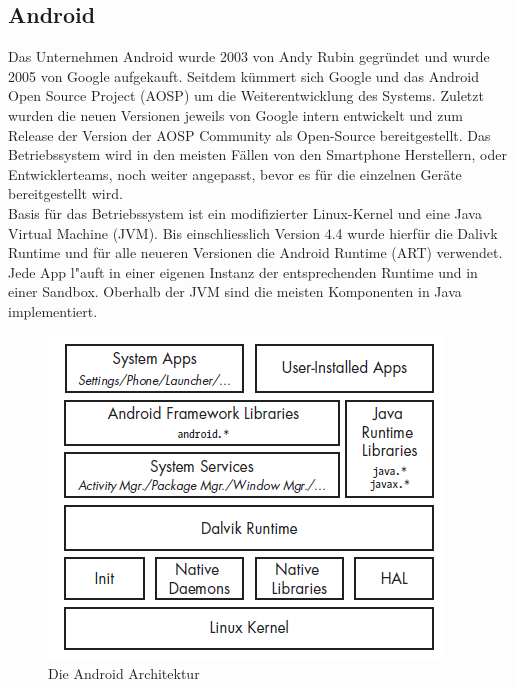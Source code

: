 \subsection{Android}
	Das Unternehmen Android wurde 2003 von Andy Rubin gegründet und wurde 2005 von Google aufgekauft. Seitdem kümmert sich Google und das Android Open Source Project (AOSP) um die Weiterentwicklung des Systems. Zuletzt wurden die neuen Versionen jeweils von Google intern entwickelt und zum Release der Version der AOSP Community als Open-Source bereitgestellt. Das Betriebssystem wird in den meisten Fällen von den Smartphone Herstellern, oder Entwicklerteams, noch weiter angepasst, bevor es für die einzelnen Geräte bereitgestellt wird.\\
	
	Basis für das Betriebssystem ist ein modifizierter Linux-Kernel und eine Java Virtual Machine (JVM)\cite{ArtDalvik}. Bis einschliesslich Version 4.4 wurde hierfür die Dalivk Runtime und für alle neueren Versionen die Android Runtime (ART) verwendet. Jede App l"auft in einer eigenen Instanz der entsprechenden Runtime und in einer Sandbox.\newline
	Oberhalb der JVM sind die meisten Komponenten in Java implementiert.\\
	
	\begin{figure}[h]
		\centering
		\includegraphics[width=0.7\linewidth]{android_pages/graphics/architektur_android_.png}
		\caption{Die Android Architektur \protect\cite{Elenkov2014} }
		\label{fig:architektur_android}
	\end{figure}
	

